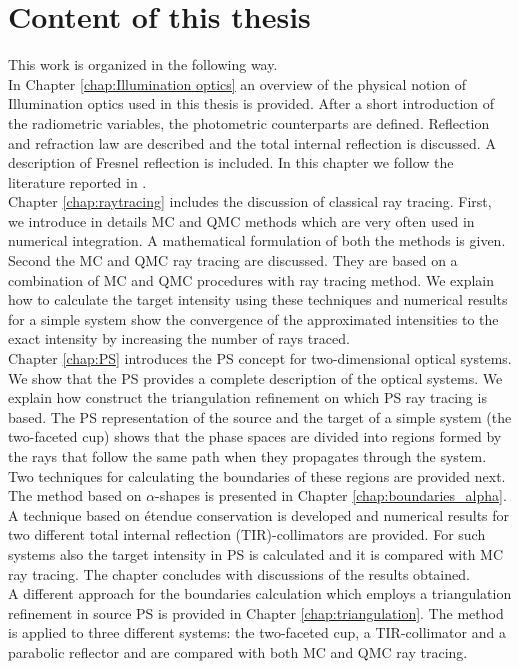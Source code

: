 \section{Content of this thesis}
This work is organized in the following way.\\ \indent
In Chapter \ref{chap:Illumination optics} an overview of the physical notion of Illumination optics used in this thesis is provided. After a short introduction of the radiometric variables, the photometric counterparts are defined. Reflection and refraction law are described and the total internal reflection is discussed. A description of Fresnel reflection is included. In this chapter we follow the literature reported in \cite{hecht1998hecht, feynman2011feynman, feynman1964feynman}.\\ \indent
Chapter \ref{chap:raytracing} includes the discussion of classical ray tracing. First, we introduce in details MC and QMC methods which are very often used in numerical integration. A mathematical formulation of both the methods is given. Second the MC and QMC ray tracing are discussed. They are based on a combination of MC and QMC procedures with ray tracing method. We explain how to calculate the target intensity using these techniques and numerical results for a simple system show the convergence of the approximated intensities to the exact intensity by increasing the number of rays traced.\\\indent
Chapter \ref{chap:PS} introduces the PS concept for two-dimensional optical systems. We show that the PS provides a complete description of the optical systems. We explain how construct the triangulation refinement on which PS ray tracing is based. The PS representation of the source and the target of a simple system (the two-faceted cup) shows that the phase spaces are divided into regions formed by the rays that follow the same path when they propagates through the system. Two techniques for calculating the boundaries of these regions are provided next. \\ \indent 
The method based on $\alpha$-shapes is presented in Chapter \ref{chap:boundaries_alpha}. A technique based on \'{e}tendue conservation is developed and numerical results for two different total internal reflection (TIR)-collimators are provided. For such systems also the target intensity in PS is calculated and it is compared with MC ray tracing. The chapter concludes with discussions of the results obtained.\\ \indent
A different approach for the boundaries calculation which employs a triangulation refinement in source PS is provided in Chapter \ref{chap:triangulation}. The method is applied to three different systems: the two-faceted cup, a TIR-collimator and a parabolic reflector and are compared with both MC and QMC ray tracing.
